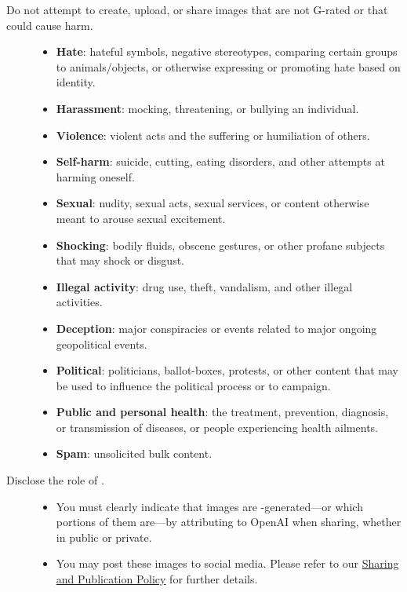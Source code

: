 \begin{description}
\item[Do not attempt to create, upload, or share images that are not G-rated or
    that could cause harm.] \hfill

    \begin{itemize}
    \item \textbf{Hate}: hateful symbols, negative stereotypes, comparing certain
        groups to animals/objects, or otherwise expressing or promoting hate based
        on identity.
    \item \textbf{Harassment}: mocking, threatening, or bullying an individual.
    \item \textbf{Violence}: violent acts and the suffering or humiliation of
        others.
    \item \textbf{Self-harm}: suicide, cutting, eating disorders, and other attempts
        at harming oneself.
    \item \textbf{Sexual}: nudity, sexual acts, sexual services, or content
        otherwise meant to arouse sexual excitement.
    \item \textbf{Shocking}: bodily fluids, obscene gestures, or other profane
        subjects that may shock or disgust.
    \item \textbf{Illegal activity}: drug use, theft, vandalism, and other illegal
        activities.
    \item \textbf{Deception}: major conspiracies or events related to major ongoing
        geopolitical events.
    \item \textbf{Political}: politicians, ballot-boxes, protests, or other content
        that may be used to influence the political process or to campaign.
    \item \textbf{Public and personal health}: the treatment, prevention, diagnosis,
        or transmission of diseases, or people experiencing health ailments.
    \item \textbf{Spam}: unsolicited bulk content.
    \end{itemize}

\item[Disclose the role of \AI.] \hfill

    \begin{itemize}
    \item You must clearly indicate that images are \AI-generated---or which
        portions of them are---by attributing to OpenAI when sharing, whether in
        public or private.
    \item You may post these images to social media. Please refer to our
        \href{https://web.archive.org/web/20220803232350/https://openai.com/api/policies/sharing-publication/}{Sharing
        and Publication Policy} for further details.
    \end{itemize}



\end{description}
